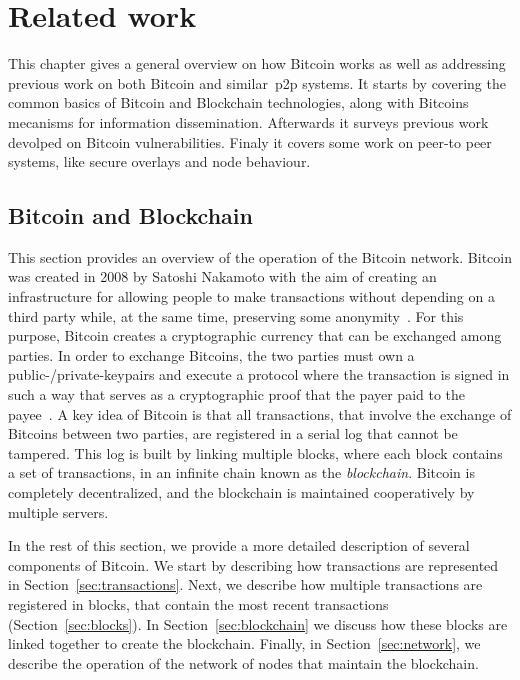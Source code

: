 \chapter{Related work}
\label{chap:rw}

This chapter gives a general overview on how Bitcoin works as well as addressing previous work on both Bitcoin and similar~\acrlong{p2p} systems. It starts by covering the common basics of Bitcoin and Blockchain technologies, along with Bitcoins mecanisms for information dissemination. Afterwards it surveys previous work devolped on Bitcoin vulnerabilities. Finaly it covers some work on peer-to peer systems, like secure overlays and  node behaviour.

\section{Bitcoin and Blockchain}
\label{sec:bb}
This section provides an overview of the operation of the Bitcoin network. Bitcoin was created in 2008 by Satoshi Nakamoto with the aim of creating an infrastructure for allowing people to make transactions without depending on a third party while, at the same time, preserving some anonymity~\cite{nakamoto2008bitcoin}. For this purpose, Bitcoin creates a cryptographic currency that can be exchanged among parties. In order to exchange Bitcoins, the two parties must own a public-/private-keypairs and execute a protocol where the transaction is signed in such a way that serves as a cryptographic proof that the payer paid to the payee~\cite{decker2013information}. A key idea of Bitcoin is that all transactions, that involve the exchange of Bitcoins between two parties, are registered in a serial log that cannot be tampered. This log is built by linking multiple blocks, where each block contains a set of transactions, in an infinite chain known as the \emph{blockchain}. Bitcoin is completely decentralized, and the blockchain is maintained cooperatively by multiple servers.

In the rest of this section, we provide a more detailed description of several components of Bitcoin. We start by describing how transactions are represented in Section~\ref{sec:transactions}. Next, we describe how multiple transactions are registered in blocks, that contain the most recent transactions (Section~\ref{sec:blocks}). In Section~\ref{sec:blockchain} we discuss how these blocks are linked together to create the blockchain. Finally, in Section~\ref{sec:network}, we describe the operation of the network of nodes that maintain the blockchain.

